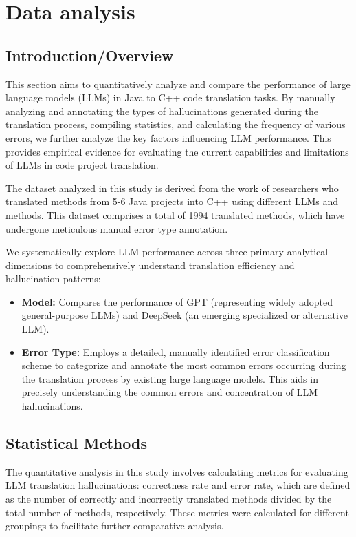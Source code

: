 \section{Data analysis}
\subsection{Introduction/Overview}
This section aims to quantitatively analyze and compare the performance of large language models (LLMs) in Java to C++ code translation tasks. By manually analyzing and annotating the types of hallucinations generated during the translation process, compiling statistics, and calculating the frequency of various errors, we further analyze the key factors influencing LLM performance. This provides empirical evidence for evaluating the current capabilities and limitations of LLMs in code project translation.

The dataset analyzed in this study is derived from the work of researchers who translated methods from 5-6 Java projects into C++ using different LLMs and methods. This dataset comprises a total of 1994 translated methods, which have undergone meticulous manual error type annotation.

We systematically explore LLM performance across three primary analytical dimensions to comprehensively understand translation efficiency and hallucination patterns:
\begin{itemize}[leftmargin=1.5em]
    \item \textbf{Model: }Compares the performance of GPT (representing widely adopted general-purpose LLMs) and DeepSeek (an emerging specialized or alternative LLM).
    \item \textbf{Error Type: }Employs a detailed, manually identified error classification scheme to categorize and annotate the most common errors occurring during the translation process by existing large language models. This aids in precisely understanding the common errors and concentration of LLM hallucinations.
\end{itemize}

\subsection{Statistical Methods}
The quantitative analysis in this study involves calculating metrics for evaluating LLM translation hallucinations: correctness rate and error rate, which are defined as the number of correctly and incorrectly translated methods divided by the total number of methods, respectively. These metrics were calculated for different groupings to facilitate further comparative analysis.

